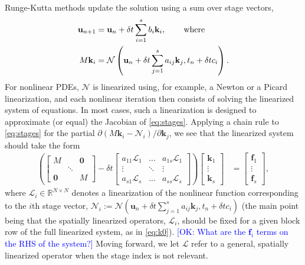 \documentclass[review]{siamart}
\newcommand{\OK}[1]{\textcolor{blue}{[OK: #1]}}
\begin{document}
Runge-Kutta methods update the solution using a sum over stage vectors,
%
\begin{align}\label{eq:update}
\mathbf{u}_{n+1} & = \mathbf{u}_n + \delta t \sum_{i=1}^s b_i\mathbf{k}_i,
	\hspace{5ex}\textnormal{where}\\
M\mathbf{k}_i & = \mathcal{N}\left(\mathbf{u}_n + \delta t\sum_{j=1}^s a_{ij}\mathbf{k}_j, t_n+\delta tc_i\right).\label{eq:stages}
\end{align}
%
For nonlinear PDEs, $\mathcal{N}$ is linearized using, for example, a Newton or a
Picard linearization, and each nonlinear iteration then consists of solving the
linearized system of equations. In most cases, such a linearization
is designed to approximate (or equal) the Jacobian of \eqref{eq:stages}. Applying
a chain rule to \eqref{eq:stages} for the partial
$\partial(M\mathbf{k}_i-\mathcal{N}_i)/\partial\mathbf{k}_j$, we see that
the linearized system should take the form
%
\begin{align}\label{eq:k0}
\left( \begin{bmatrix} M  & & \mathbf{0} \\ & \ddots \\ \mathbf{0} & & M\end{bmatrix}
	- \delta t \begin{bmatrix} a_{11}\mathcal{L}_1 & ... & a_{1s}\mathcal{L}_1 \\
	\vdots & \ddots & \vdots \\ a_{s1}\mathcal{L}_s & ... & a_{ss} \mathcal{L}_s \end{bmatrix} \right)
	\begin{bmatrix} \mathbf{k}_1 \\ \vdots \\ \mathbf{k}_s \end{bmatrix}
& = \begin{bmatrix} \mathbf{f}_1 \\ \vdots \\ \mathbf{f}_s \end{bmatrix},
\end{align}
%
where $\mathcal{L}_i\in\mathbb{R}^{N\times N}$
denotes a linearization of the nonlinear function
corresponding to the $i$th stage vector, $\mathcal{N}_i:= \mathcal{N}\left(\mathbf{u}_n +
\delta t\sum_{j=1}^s a_{ij}\mathbf{k}_j, t_n+\delta tc_i\right)$ (the main
point being that the spatially linearized operators, $\mathcal{L}_i$, should
be fixed for a given block row of the full linearized system, as in \eqref{eq:k0}).
%
\OK{What are the $\bm{f}_i$ terms on the RHS of the system?}
%
Moving forward, we let $\mathcal{L}$ refer to a general, spatially linearized
operator when the stage index is not relevant.
\end{document}
